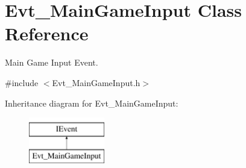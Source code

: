 \hypertarget{classEvt__MainGameInput}{\section{Evt\-\_\-\-Main\-Game\-Input Class Reference}
\label{classEvt__MainGameInput}
}


Main Game Input Event.  




{\ttfamily \#include $<$Evt\-\_\-\-Main\-Game\-Input.\-h$>$}

Inheritance diagram for Evt\-\_\-\-Main\-Game\-Input\-:\begin{figure}[H]
\begin{center}
\leavevmode
\includegraphics[height=2.000000cm]{classEvt__MainGameInput}
\end{center}
\end{figure}
